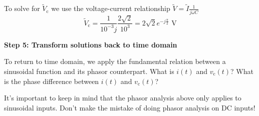 \begin{enumerate}
{To solve for $\widetilde{V}_{\text{c}}$ we use the voltage-current relationship $\widetilde{V} = \widetilde{I} \frac{1}{j \omega C}$
$$\widetilde{V}_{\text{c}} = \frac{1}{10^{-3} j} \frac{2 \sqrt{2}}{10^{3}} = 2 \sqrt{2} e^{-j \frac{\pi}{2}} \mbox{ V}$$
}



\qitem \textbf{Step 5: Transform solutions back to time domain}

To return to time domain, we apply the fundamental relation between a sinusoidal function and its phasor counterpart.
What is $i(t)$ and $v_{\text{c}}(t)$? What is the phase difference between $i(t)$ and $v_{\text{c}}(t)$?

\ws{\vspace{100px}}



\end{enumerate}

It's important to keep in mind that the phasor analysis above only applies to
sinusoidal inputs. Don't make the mistake of doing phasor analysis on DC inputs!

